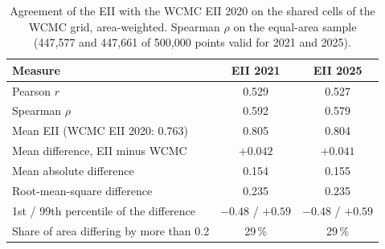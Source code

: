 \documentclass[11pt,a4paper]{article}
\begin{document}
\begin{table}[H]
\centering\small
\caption{Agreement of the EII with the WCMC EII 2020 on the shared cells of the WCMC grid,
area-weighted. Spearman $\rho$ on the equal-area sample (447,577 and 447,661 of 500,000 points
valid for 2021 and 2025).}
\label{tab:wcmc}
\begin{tabular}{lcc}
\toprule
Measure & EII 2021 & EII 2025 \\
\midrule
Pearson $r$ & 0.529 & 0.527 \\
Spearman $\rho$ & 0.592 & 0.579 \\
Mean EII (WCMC EII 2020: 0.763) & 0.805 & 0.804 \\
Mean difference, EII minus WCMC & $+0.042$ & $+0.041$ \\
Mean absolute difference & 0.154 & 0.155 \\
Root-mean-square difference & 0.235 & 0.235 \\
1st / 99th percentile of the difference & $-0.48$ / $+0.59$ & $-0.48$ / $+0.59$ \\
Share of area differing by more than 0.2 & 29\,\% & 29\,\% \\
\bottomrule
\end{tabular}
\end{table}
\end{document}
